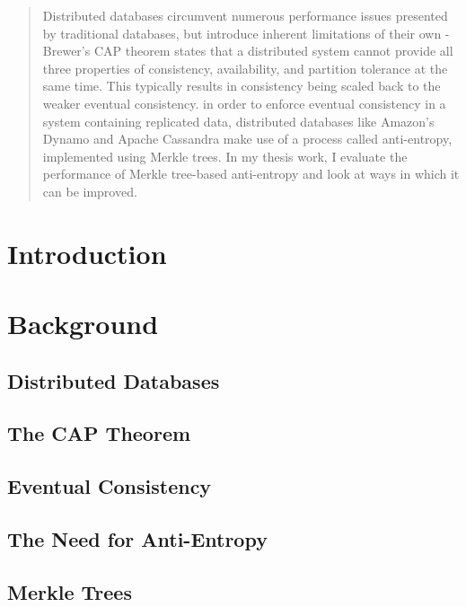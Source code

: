 \documentclass[10pt,letterpaper]{report}
\begin{document}
\maketitle

\begin{abstract}
Distributed databases circumvent numerous performance issues presented by traditional databases, but introduce inherent limitations of their own - Brewer's CAP theorem states that a distributed system cannot provide all three properties of consistency, availability, and partition tolerance at the same time. This typically results in consistency being scaled back to the weaker eventual consistency. in order to enforce eventual consistency in a system containing replicated data, distributed databases like Amazon's Dynamo and Apache Cassandra make use of a process called anti-entropy, implemented using Merkle trees. In my thesis work, I evaluate the performance of Merkle tree-based anti-entropy and look at ways in which it can be improved.
\end{abstract}

\tableofcontents

\section{Introduction}

\section{Background}

\subsection{Distributed Databases}

\subsection{The CAP Theorem}

\subsection{Eventual Consistency}

\subsection{The Need for Anti-Entropy}

\subsection{Merkle Trees}
\end{document}
